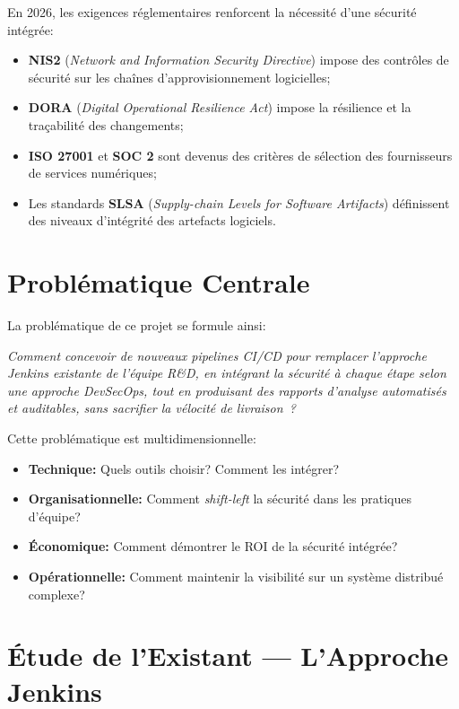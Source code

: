 En 2026, les exigences réglementaires renforcent la nécessité d'une sécurité intégrée:

\begin{itemize}
    \item \textbf{NIS2} (\textit{Network and Information Security Directive}) impose des contrôles
    de sécurité sur les chaînes d'approvisionnement logicielles;
    \item \textbf{DORA} (\textit{Digital Operational Resilience Act}) impose la résilience et
    la traçabilité des changements;
    \item \textbf{ISO 27001} et \textbf{SOC 2} sont devenus des critères de sélection des
    fournisseurs de services numériques;
    \item Les standards \textbf{SLSA} (\textit{Supply-chain Levels for Software Artifacts})
    définissent des niveaux d'intégrité des artefacts logiciels.
\end{itemize}


\section{Problématique Centrale}

La problématique de ce projet se formule ainsi:

\begin{infobox}
    \textit{Comment concevoir de nouveaux pipelines CI/CD pour remplacer l'approche Jenkins
    existante de l'équipe R\&D, en intégrant la sécurité à chaque étape selon une approche
    DevSecOps, tout en produisant des rapports d'analyse automatisés et auditables, sans
    sacrifier la vélocité de livraison~?}
\end{infobox}

Cette problématique est multidimensionnelle:
\begin{itemize}
    \item \textbf{Technique:} Quels outils choisir? Comment les intégrer?
    \item \textbf{Organisationnelle:} Comment \textit{shift-left} la sécurité dans les pratiques
    d'équipe?
    \item \textbf{Économique:} Comment démontrer le ROI de la sécurité intégrée?
    \item \textbf{Opérationnelle:} Comment maintenir la visibilité sur un système distribué
    complexe?
\end{itemize}


\section{Étude de l'Existant --- L'Approche Jenkins}


